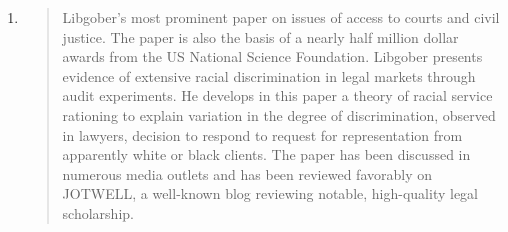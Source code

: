 \documentclass[12pt]{article}
\begin{document}
\begin{enumerate}
\item {}

\begin{quote}
Libgober's most prominent paper on  issues of access to courts and civil justice. The paper is also the basis of a nearly half million dollar awards from the US National Science Foundation. Libgober presents evidence of extensive racial discrimination in legal markets through audit experiments. He develops in this paper a theory of racial service rationing to explain variation in the degree of discrimination, observed in lawyers, decision to respond to request for representation from apparently white or black clients. The paper has been discussed in numerous media outlets and has been reviewed favorably on JOTWELL, a well-known blog reviewing notable, high-quality legal scholarship. 
\end{quote}

\end{enumerate}
\end{document}
